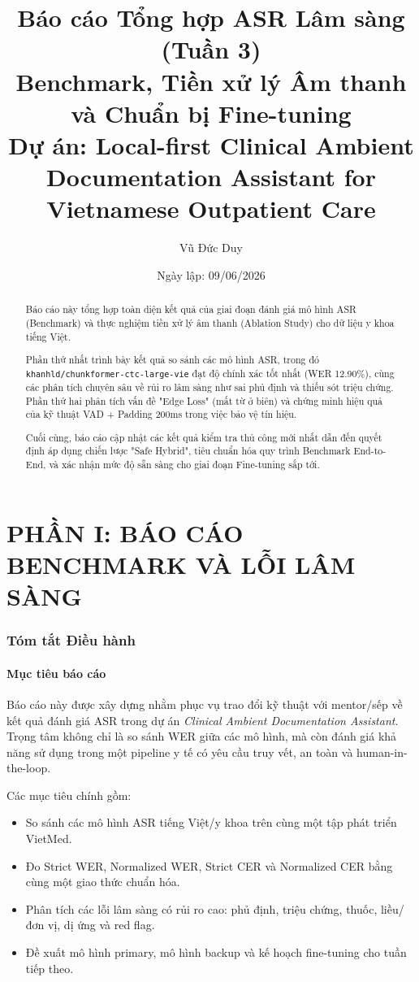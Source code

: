 \documentclass[12pt,a4paper]{article}
\title{
    \textbf{Báo cáo Tổng hợp ASR Lâm sàng (Tuần 3)}\\

    \large Benchmark, Tiền xử lý Âm thanh và Chuẩn bị Fine-tuning\\
    \normalsize Dự án: Local-first Clinical Ambient Documentation Assistant for Vietnamese Outpatient Care
}
\author{Vũ Đức Duy}
\date{Ngày lập: 09/06/2026}
\begin{document}
\maketitle

\begin{abstract}
Báo cáo này tổng hợp toàn diện kết quả của giai đoạn đánh giá mô hình ASR (Benchmark) và thực nghiệm tiền xử lý âm thanh (Ablation Study) cho dữ liệu y khoa tiếng Việt. 

Phần thứ nhất trình bày kết quả so sánh các mô hình ASR, trong đó \texttt{khanhld/chunkformer-ctc-large-vie} đạt độ chính xác tốt nhất (WER 12.90\%), cùng các phân tích chuyên sâu về rủi ro lâm sàng như sai phủ định và thiếu sót triệu chứng. Phần thứ hai phân tích vấn đề "Edge Loss" (mất từ ở biên) và chứng minh hiệu quả của kỹ thuật VAD + Padding 200ms trong việc bảo vệ tín hiệu. 

Cuối cùng, báo cáo cập nhật các kết quả kiểm tra thủ công mới nhất dẫn đến quyết định áp dụng chiến lược "Safe Hybrid", tiêu chuẩn hóa quy trình Benchmark End-to-End, và xác nhận mức độ sẵn sàng cho giai đoạn Fine-tuning sắp tới.
\end{abstract}

\tableofcontents
\newpage

\part*{PHẦN I: BÁO CÁO BENCHMARK VÀ LỖI LÂM SÀNG}

\section{Tóm tắt Điều hành}

\subsection{Mục tiêu báo cáo}

Báo cáo này được xây dựng nhằm phục vụ trao đổi kỹ thuật với mentor/sếp về kết quả đánh giá ASR trong dự án \textit{Clinical Ambient Documentation Assistant}. Trọng tâm không chỉ là so sánh WER giữa các mô hình, mà còn đánh giá khả năng sử dụng trong một pipeline y tế có yêu cầu truy vết, an toàn và human-in-the-loop.

Các mục tiêu chính gồm:
\begin{itemize}[leftmargin=1.2cm]
    \item So sánh các mô hình ASR tiếng Việt/y khoa trên cùng một tập phát triển VietMed.
    \item Đo Strict WER, Normalized WER, Strict CER và Normalized CER bằng cùng một giao thức chuẩn hóa.
    \item Phân tích các lỗi lâm sàng có rủi ro cao: phủ định, triệu chứng, thuốc, liều/đơn vị, dị ứng và red flag.
    \item Đề xuất mô hình primary, mô hình backup và kế hoạch fine-tuning cho tuần tiếp theo.
\end{itemize}
\end{document}
